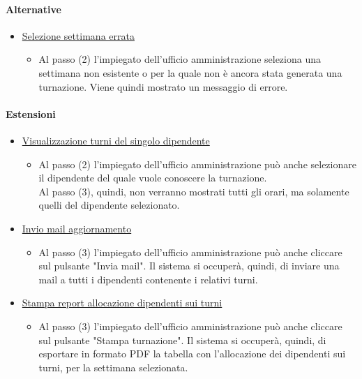 \paragraph{Alternative}
\begin{itemize}
	\item \underline{Selezione settimana errata}
		\begin{itemize}
			\item Al passo (2) l'impiegato dell'ufficio amministrazione seleziona una settimana non esistente o per la quale non è ancora stata generata una turnazione. Viene quindi mostrato un messaggio di errore.
		\end{itemize}
\end{itemize}
\paragraph{Estensioni}
\begin{itemize}
	\item \underline{Visualizzazione turni del singolo dipendente}
		\begin{itemize}
			\item Al passo (2) l'impiegato dell'ufficio amministrazione può anche selezionare il dipendente del quale vuole conoscere la turnazione.\\
				Al passo (3), quindi, non verranno mostrati tutti gli orari, ma solamente quelli del dipendente selezionato.
		\end{itemize}
	\item \underline{Invio mail aggiornamento}
		\begin{itemize}
			\item Al passo (3) l'impiegato dell'ufficio amministrazione può anche cliccare sul pulsante "Invia mail". Il sistema si occuperà, quindi, di inviare una mail a tutti i dipendenti contenente i relativi turni.
		\end{itemize}
	\item \underline{Stampa report allocazione dipendenti sui turni}
		\begin{itemize}
			\item Al passo (3) l'impiegato dell'ufficio amministrazione può anche cliccare sul pulsante "Stampa turnazione". Il sistema si occuperà, quindi, di esportare in formato PDF la tabella con l'allocazione dei dipendenti sui turni, per la settimana selezionata.
		\end{itemize}
\end{itemize}
